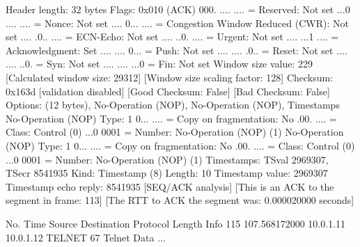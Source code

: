     Header length: 32 bytes
    Flags: 0x010 (ACK)
        000. .... .... = Reserved: Not set
        ...0 .... .... = Nonce: Not set
        .... 0... .... = Congestion Window Reduced (CWR): Not set
        .... .0.. .... = ECN-Echo: Not set
        .... ..0. .... = Urgent: Not set
        .... ...1 .... = Acknowledgment: Set
        .... .... 0... = Push: Not set
        .... .... .0.. = Reset: Not set
        .... .... ..0. = Syn: Not set
        .... .... ...0 = Fin: Not set
    Window size value: 229
    [Calculated window size: 29312]
    [Window size scaling factor: 128]
    Checksum: 0x163d [validation disabled]
        [Good Checksum: False]
        [Bad Checksum: False]
    Options: (12 bytes), No-Operation (NOP), No-Operation (NOP), Timestamps
        No-Operation (NOP)
            Type: 1
                0... .... = Copy on fragmentation: No
                .00. .... = Class: Control (0)
                ...0 0001 = Number: No-Operation (NOP) (1)
        No-Operation (NOP)
            Type: 1
                0... .... = Copy on fragmentation: No
                .00. .... = Class: Control (0)
                ...0 0001 = Number: No-Operation (NOP) (1)
        Timestamps: TSval 2969307, TSecr 8541935
            Kind: Timestamp (8)
            Length: 10
            Timestamp value: 2969307
            Timestamp echo reply: 8541935
    [SEQ/ACK analysis]
        [This is an ACK to the segment in frame: 113]
        [The RTT to ACK the segment was: 0.000020000 seconds]

No.     Time           Source                Destination           Protocol Length Info
    115 107.568172000  10.0.1.11             10.0.1.12             TELNET   67     Telnet Data ...

